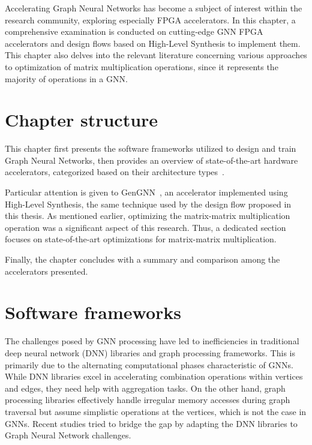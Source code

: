 Accelerating Graph Neural Networks has become a subject of interest within the research community, exploring especially FPGA accelerators.
In this chapter, a comprehensive examination is conducted on cutting-edge GNN FPGA accelerators and design flows based on High-Level Synthesis to implement them.
This chapter also delves into the relevant literature concerning various approaches to optimization of matrix multiplication operations, since it represents the majority of operations in a GNN.

\section{Chapter structure}
\label{sec:related_work_structure}%
This chapter first presents the software frameworks utilized to design and train Graph Neural Networks, then provides an overview of state-of-the-art hardware accelerators, categorized based on their architecture types~\cite{DBLP:journals/corr/abs-2010-00130}.

Particular attention is given to GenGNN~\cite{DBLP:journals/corr/abs-2201-08475}, an accelerator implemented using High-Level Synthesis, the same technique used by the design flow proposed in this thesis.
As mentioned earlier, optimizing the matrix-matrix multiplication operation was a significant aspect of this research.
Thus, a dedicated section focuses on state-of-the-art optimizations for matrix-matrix multiplication.

Finally, the chapter concludes with a summary and comparison among the accelerators presented.

\section{Software frameworks}
\label{sec:related_work_software_frameworks}%

The challenges posed by GNN processing have led to inefficiencies in traditional deep neural network (DNN) libraries and graph processing frameworks.
This is primarily due to the alternating computational phases characteristic of GNNs.
While DNN libraries excel in accelerating combination operations within vertices and edges, they need help with aggregation tasks.
On the other hand, graph processing libraries effectively handle irregular memory accesses during graph traversal but assume simplistic operations at the vertices, which is not the case in GNNs.
Recent studies tried to bridge the gap by adapting the DNN libraries to Graph Neural Network challenges.

